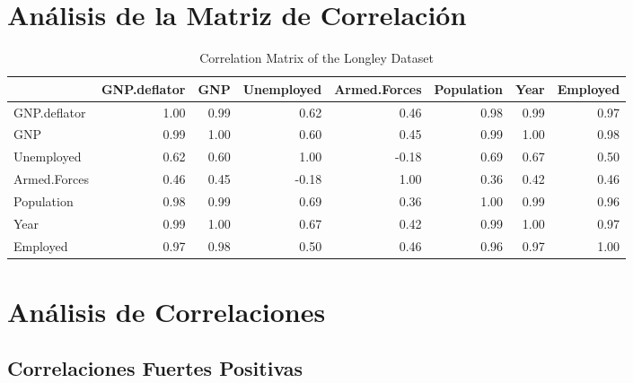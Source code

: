 \documentclass{article}
\begin{document}
\section{Análisis de la Matriz de Correlación}


\begin{table}[ht]
    \centering
    \begin{adjustbox}{max width=\textwidth}
    \begin{tabular}{lrrrrrrr}
    \hline
     & GNP.deflator & GNP & Unemployed & Armed.Forces & Population & Year & Employed \\ 
    \hline
    GNP.deflator & 1.00 & 0.99 & 0.62 & 0.46 & 0.98 & 0.99 & 0.97 \\ 
    GNP & 0.99 & 1.00 & 0.60 & 0.45 & 0.99 & 1.00 & 0.98 \\ 
    Unemployed & 0.62 & 0.60 & 1.00 & -0.18 & 0.69 & 0.67 & 0.50 \\ 
    Armed.Forces & 0.46 & 0.45 & -0.18 & 1.00 & 0.36 & 0.42 & 0.46 \\ 
    Population & 0.98 & 0.99 & 0.69 & 0.36 & 1.00 & 0.99 & 0.96 \\ 
    Year & 0.99 & 1.00 & 0.67 & 0.42 & 0.99 & 1.00 & 0.97 \\ 
    Employed & 0.97 & 0.98 & 0.50 & 0.46 & 0.96 & 0.97 & 1.00 \\ 
    \hline
    \end{tabular}
    \end{adjustbox}
    \caption{Correlation Matrix of the Longley Dataset}
    \label{tab:correlation_matrix_longley}
    \end{table}
    

    \section{Análisis de Correlaciones}

    \subsection{Correlaciones Fuertes Positivas}
    
\end{document}
